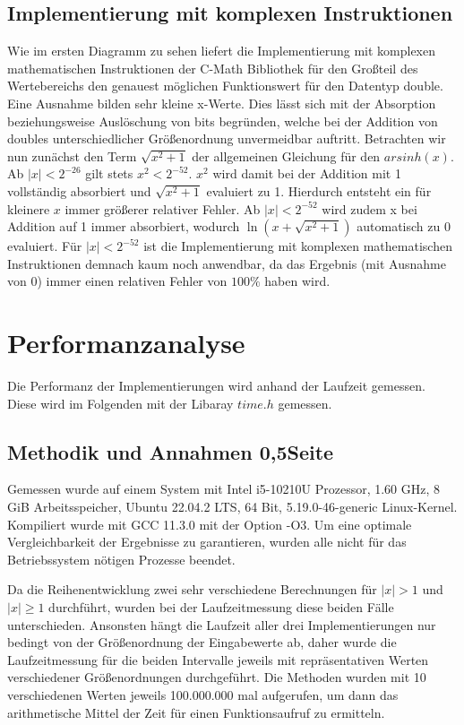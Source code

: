 \documentclass[course=erap] {aspdoc}
\begin{document}
    \subsection{Implementierung mit komplexen Instruktionen}
    Wie im ersten Diagramm zu sehen liefert die Implementierung mit komplexen mathematischen Instruktionen der C-Math Bibliothek für den Großteil des Wertebereichs den genauest möglichen Funktionswert für den Datentyp double. Eine Ausnahme bilden sehr kleine x-Werte. Dies lässt sich mit der Absorption beziehungsweise Auslöschung von bits begründen, welche bei der Addition von doubles unterschiedlicher Größenordnung unvermeidbar auftritt. Betrachten wir nun zunächst den Term $\sqrt{x^2 + 1}$ der allgemeinen Gleichung für den $arsinh(x)$. Ab $|x|<2^{-26}$ gilt stets $x^2<2^{-52}$. $x^2$ wird damit bei der Addition mit 1 vollständig absorbiert und $\sqrt{x^2 + 1}$ evaluiert zu 1. Hierdurch entsteht ein für kleinere $x$ immer größerer relativer Fehler. Ab $|x|<2^{-52}$ wird zudem x bei Addition auf 1 immer absorbiert, wodurch $\ln{(x+\sqrt{x^2 + 1})}$ automatisch zu 0 evaluiert. Für $|x|<2^{-52}$ ist die Implementierung mit komplexen mathematischen Instruktionen demnach kaum noch anwendbar, da das Ergebnis (mit Ausnahme von 0) immer einen relativen Fehler von $100\%$ haben wird.
    
    \section{Performanzanalyse}
    Die Performanz der Implementierungen wird anhand der Laufzeit gemessen.
    Diese wird im Folgenden mit der Libaray $time.h$ gemessen.

    \subsection{Methodik und Annahmen 0,5Seite}

    Gemessen wurde auf einem System mit Intel i5-10210U Prozessor, 1.60 GHz, 8 GiB Arbeitsspeicher, Ubuntu 22.04.2 LTS, 64 Bit, 5.19.0-46-generic Linux-Kernel.
    Kompiliert wurde mit GCC 11.3.0 mit der Option -O3. Um eine optimale Vergleichbarkeit der Ergebnisse zu garantieren, wurden alle nicht für das Betriebssystem nötigen Prozesse beendet. 

    Da die Reihenentwicklung zwei sehr verschiedene Berechnungen für $|x|>1$ und $|x|\geq 1$ durchführt, wurden bei der Laufzeitmessung diese beiden Fälle unterschieden.
    Ansonsten hängt die Laufzeit aller drei Implementierungen nur bedingt von der Größenordnung der Eingabewerte ab, daher wurde die Laufzeitmessung für die beiden Intervalle jeweils mit repräsentativen Werten verschiedener Größenordnungen durchgeführt.
    Die Methoden wurden mit 10 verschiedenen Werten jeweils 100.000.000 mal aufgerufen, um dann das arithmetische Mittel der Zeit für einen Funktionsaufruf zu ermitteln.
\end{document}
